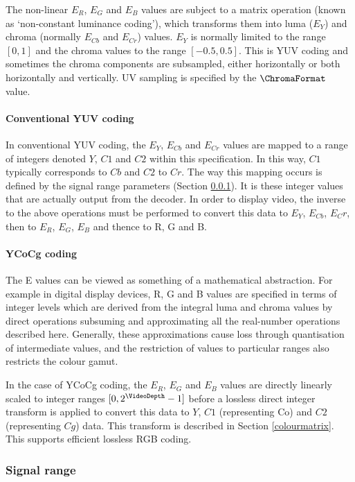\begin{informative*}
The non-linear $E_R$, $E_G$ and $E_B$ values are subject to a matrix operation
(known as `non-constant luminance coding'), which transforms
them into luma ($E_Y$) and chroma (normally $E_{Cb}$ and $E_{Cr}$) values. 
$E_Y$ is normally limited to the 
range $[0,1]$ and the chroma
values to the range $[-0.5, 0.5]$. This is YUV coding and
sometimes the chroma components are subsampled, either horizontally or
both horizontally and vertically. UV sampling is specified by the
$\ChromaFormat$ value. 

\paragraph{Conventional YUV coding\\}
In conventional YUV coding, the $E_Y$, $E_{Cb}$ and $E_{Cr}$ values are
mapped to a range of integers denoted $Y$, $C1$ and $C2$ within this
specification. In this way, $C1$ typically corresponds to $Cb$ and
$C2$ to $Cr$. The way this mapping occurs is defined by the signal
range parameters (Section \ref{signalranges}). It is these integer values 
that are actually output from the decoder. In order to display video, the inverse to the above
operations must be performed to convert this data to $E_Y$, $E_{Cb}$, $E_Cr$, then
to $E_R$, $E_G$, $E_B$ and thence to R, G and B.  

\paragraph{YCoCg coding\\}
The E values can be viewed as something of a mathematical abstraction.
For example in digital display devices, R, G and B values are specified
in terms of integer levels which are derived from the integral luma and
chroma values by direct operations subsuming and approximating all the
real-number operations described here. Generally, these approximations
cause loss through quantisation of intermediate values, and the
restriction of values to particular ranges also restricts the colour
gamut. 

In the case of YCoCg coding, the $E_R$, $E_G$ and $E_B$ values are directly
linearly scaled to integer ranges $[0,2^\VideoDepth-1]$ before a lossless 
direct integer transform is applied to convert this data to $Y$, $C1$ (representing
Co) and $C2$ (representing $Cg$) data. This transform is described in Section
\ref{colourmatrix}. This supports efficient lossless RGB coding.

\subsubsection{Signal range}
\label{signalranges}


\end{informative*}
